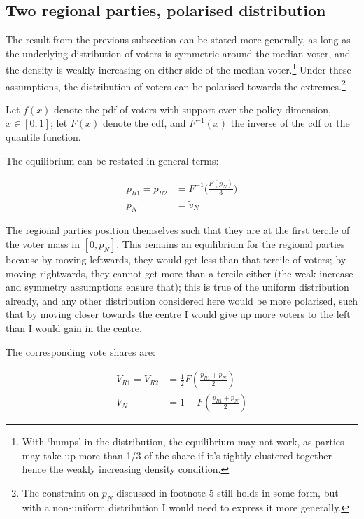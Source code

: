 \documentclass[11pt]{article}
\begin{document}
\subsection{Two regional parties, polarised distribution}

The result from the previous subsection can be stated more generally, as long as the underlying distribution of voters is symmetric around the median voter, and the density is weakly increasing on either side of the median voter.\footnote{With `humps' in the distribution, the equilibrium may not work, as parties may take up more than 1/3 of the share if it's tightly clustered together -- hence the weakly increasing density condition.} Under these assumptions, the distribution of voters can be polarised towards the extremes.\footnote{The constraint on $p_N$ discussed in footnote 5 still holds in some form, but with a non-uniform distribution I would need to express it more generally.}

Let $f(x)$ denote the pdf of voters with support over the policy dimension, $x \in [0, 1]$; let $F(x)$ denote the cdf, and $F^{-1}(x)$ the inverse of the cdf or the quantile function.

The equilibrium can be restated in general terms:

\begin{align*}
    p_{R1} = p_{R2} & = F^{-1}\Big(\frac{F(p_N)}{3}\Big) \\
    p_N & = \tilde{v}_N
\end{align*}

The regional parties position themselves such that they are at the first tercile of the voter mass in $[0, p_N]$. This remains an equilibrium for the regional parties because by moving leftwards, they would get less than that tercile of voters; by moving rightwards, they cannot get more than a tercile either (the weak increase and symmetry assumptions ensure that); this is true of the uniform distribution already, and any other distribution considered here would be more polarised, such that by moving closer towards the centre I would give up more voters to the left than I would gain in the centre.

The corresponding vote shares are:

\begin{align*}
    V_{R1} = V_{R2} & = \frac{1}{2} F(\frac{p_{R1} + p_N}{2}) \\
    V_N & = 1 - F(\frac{p_{R1} + p_N}{2})
\end{align*}
\end{document}
